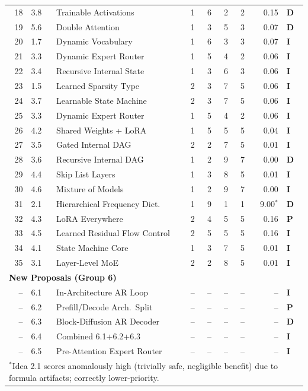 \documentclass[11pt]{article}
\begin{document}
\begin{table}[h]
\begin{tabular}{rllrrrrrl}
18 & 3.8 & Trainable Activations & 1 & 6 & 2 & 2 & 0.15 & \textbf{D} \\
19 & 5.6 & Double Attention & 1 & 3 & 5 & 3 & 0.07 & \textbf{D} \\
20 & 1.7 & Dynamic Vocabulary & 1 & 6 & 3 & 3 & 0.07 & \textbf{I} \\
21 & 3.3 & Dynamic Expert Router & 1 & 5 & 4 & 2 & 0.06 & \textbf{I} \\
22 & 3.4 & Recursive Internal State & 1 & 3 & 6 & 3 & 0.06 & \textbf{I} \\
23 & 1.5 & Learned Sparsity Type & 2 & 3 & 7 & 5 & 0.06 & \textbf{I} \\
24 & 3.7 & Learnable State Machine & 2 & 3 & 7 & 5 & 0.06 & \textbf{I} \\
25 & 3.3 & Dynamic Expert Router & 1 & 5 & 4 & 2 & 0.06 & \textbf{I} \\
26 & 4.2 & Shared Weights + LoRA & 1 & 5 & 5 & 5 & 0.04 & \textbf{I} \\
27 & 3.5 & Gated Internal DAG & 2 & 2 & 7 & 5 & 0.01 & \textbf{I} \\
28 & 3.6 & Recursive Internal DAG & 1 & 2 & 9 & 7 & 0.00 & \textbf{D} \\
29 & 4.4 & Skip List Layers & 1 & 3 & 8 & 5 & 0.01 & \textbf{I} \\
30 & 4.6 & Mixture of Models & 1 & 2 & 9 & 7 & 0.00 & \textbf{I} \\
31 & 2.1 & Hierarchical Frequency Dict. & 1 & 9 & 1 & 1 & 9.00$^*$ & \textbf{D} \\
32 & 4.3 & LoRA Everywhere & 2 & 4 & 5 & 5 & 0.16 & \textbf{P} \\
33 & 4.5 & Learned Residual Flow Control & 2 & 5 & 5 & 5 & 0.16 & \textbf{I} \\
34 & 4.1 & State Machine Core & 1 & 3 & 7 & 5 & 0.01 & \textbf{I} \\
35 & 3.1 & Layer-Level MoE & 2 & 2 & 8 & 5 & 0.01 & \textbf{I} \\
\hline
\multicolumn{9}{l}{\textbf{New Proposals (Group 6)}} \\
\hline
-- & 6.1 & In-Architecture AR Loop & -- & -- & -- & -- & -- & \textbf{I} \\
-- & 6.2 & Prefill/Decode Arch.\ Split & -- & -- & -- & -- & -- & \textbf{P} \\
-- & 6.3 & Block-Diffusion AR Decoder & -- & -- & -- & -- & -- & \textbf{D} \\
-- & 6.4 & Combined 6.1+6.2+6.3 & -- & -- & -- & -- & -- & \textbf{I} \\
-- & 6.5 & Pre-Attention Expert Router & -- & -- & -- & -- & -- & \textbf{I} \\
\hline
\multicolumn{9}{l}{$^*$Idea 2.1 scores anomalously high (trivially safe, negligible benefit) due to formula artifacts; correctly lower-priority.}
\end{tabular}
\end{table}
\end{document}
